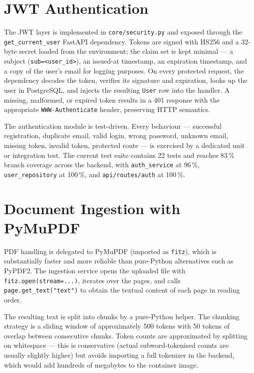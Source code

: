 \section{JWT Authentication}
\label{sec:jwt-impl}

The JWT layer is implemented in \texttt{core/security.py} and exposed
through the \texttt{get\_current\_user} FastAPI dependency.
Tokens are signed with HS256 and a 32-byte secret loaded from the
environment; the claim set is kept minimal --- a subject
(\texttt{sub=<user\_id>}), an issued-at timestamp, an expiration
timestamp, and a copy of the user's email for logging purposes. On every
protected request, the dependency decodes the token, verifies its
signature and expiration, looks up the user in PostgreSQL, and injects
the resulting \texttt{User} row into the handler. A missing, malformed,
or expired token results in a 401 response with the appropriate
\texttt{WWW-Authenticate} header, preserving HTTP semantics.

The authentication module is test-driven. Every behaviour --- successful
registration, duplicate email, valid login, wrong password, unknown
email, missing token, invalid token, protected route --- is exercised by
a dedicated unit or integration test. The current test suite contains 22
tests and reaches 83\,\% branch coverage across the backend, with
\texttt{auth\_service} at 96\,\%, \texttt{user\_repository} at 100\,\%,
and \texttt{api/routes/auth} at 100\,\%.

\section{Document Ingestion with PyMuPDF}
\label{sec:ingestion-impl}

PDF handling is delegated to PyMuPDF (imported as \texttt{fitz}), which
is substantially faster and more reliable than pure-Python alternatives
such as PyPDF2. The ingestion service opens the uploaded file with
\texttt{fitz.open(stream=...)}, iterates over the pages, and calls
\texttt{page.get\_text("text")} to obtain the textual content of each
page in reading order.

The resulting text is split into chunks by a pure-Python helper. The
chunking strategy is a sliding window of approximately 500 tokens with
50 tokens of overlap between consecutive chunks. Token counts are
approximated by splitting on whitespace --- this is conservative (actual
subword-tokenised counts are usually slightly higher) but avoids
importing a full tokenizer in the backend, which would add hundreds of
megabytes to the container image.

